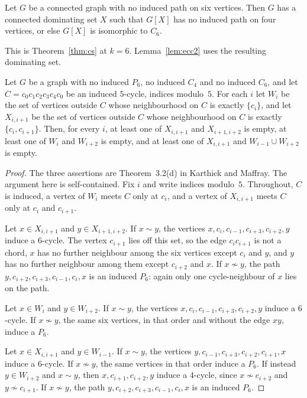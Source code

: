 \documentclass[ASNA]{USG}
\theoremstyle{WBstyletwo}
\numberwithin{equation}{section}
\begin{document}
\begin{lemma}\label{lem:cs6}
Let $G$ be a connected graph with no induced path on six vertices. Then $G$ has a connected dominating set $X$ such that $G[X]$ has no induced path on four vertices, or else $G[X]$ is isomorphic to $C_6$.
\end{lemma}

This is Theorem~\ref{thm:cs} at $k=6$. Lemma~\ref{lem:ecc2} uses the resulting dominating set.

\begin{lemma}\label{lem:km}
Let $G$ be a graph with no induced $P_6$, no induced $C_4$ and no induced $C_6$, and let $C=c_0c_1c_2c_3c_4c_0$ be an induced $5$-cycle, indices modulo~$5$. For each $i$ let $W_i$ be the set of vertices outside $C$ whose neighbourhood on $C$ is exactly $\{c_i\}$, and let $X_{i,i+1}$ be the set of vertices outside $C$ whose neighbourhood on $C$ is exactly $\{c_i,c_{i+1}\}$. Then, for every $i$, at least one of $X_{i,i+1}$ and $X_{i+1,i+2}$ is empty, at least one of $W_i$ and $W_{i+2}$ is empty, and at least one of $X_{i,i+1}$ and $W_{i-1}\cup W_{i+2}$ is empty.
\end{lemma}

\begin{proof}
The three assertions are Theorem~3.2(d) in Karthick and Maffray. The argument here is self-contained. Fix $i$ and write indices modulo~$5$. Throughout, $C$ is induced, a vertex of $W_i$ meets $C$ only at $c_i$, and a vertex of $X_{i,i+1}$ meets $C$ only at $c_i$ and $c_{i+1}$.

Let $x\in X_{i,i+1}$ and $y\in X_{i+1,i+2}$. If $x\sim y$, the vertices $x,c_i,c_{i-1},c_{i+3},c_{i+2},y$ induce a $6$-cycle. The vertex $c_{i+1}$ lies off this set, so the edge $c_ic_{i+1}$ is not a chord, $x$ has no further neighbour among the six vertices except $c_i$ and $y$, and $y$ has no further neighbour among them except $c_{i+2}$ and $x$. If $x\nsim y$, the path $y,c_{i+2},c_{i+3},c_{i-1},c_i,x$ is an induced $P_6$: again only one cycle-neighbour of $x$ lies on the path.

Let $x\in W_i$ and $y\in W_{i+2}$. If $x\sim y$, the vertices $x,c_i,c_{i-1},c_{i+3},c_{i+2},y$ induce a $6$-cycle. If $x\nsim y$, the same six vertices, in that order and without the edge $xy$, induce a $P_6$.

Let $x\in X_{i,i+1}$ and $y\in W_{i-1}$. If $x\sim y$, the vertices $y,c_{i-1},c_{i+3},c_{i+2},c_{i+1},x$ induce a $6$-cycle. If $x\nsim y$, the same vertices in that order induce a $P_6$. If instead $y\in W_{i+2}$ and $x\sim y$, then $x,c_{i+1},c_{i+2},y$ induce a $4$-cycle, since $x\nsim c_{i+2}$ and $y\nsim c_{i+1}$. If $x\nsim y$, the path $y,c_{i+2},c_{i+3},c_{i-1},c_i,x$ is an induced $P_6$.
\end{proof}
\end{document}
